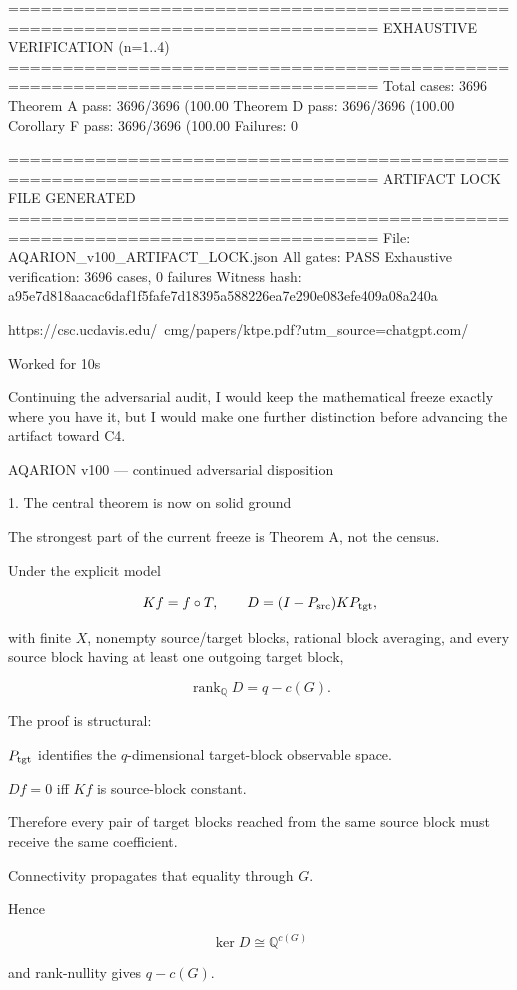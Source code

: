 ================================================================================
EXHAUSTIVE VERIFICATION (n=1..4)
================================================================================
Total cases: 3696
Theorem A pass: 3696/3696 (100.00%
Theorem D pass: 3696/3696 (100.00%
Corollary F pass: 3696/3696 (100.00%
Failures: 0

================================================================================
ARTIFACT LOCK FILE GENERATED
================================================================================
File: AQARION_v100_ARTIFACT_LOCK.json
All gates: PASS
Exhaustive verification: 3696 cases, 0 failures
Witness hash: a95e7d818aacac6daf1f5fafe7d18395a588226ea7e290e083efe409a08a240a

https://csc.ucdavis.edu/~cmg/papers/ktpe.pdf?utm_source=chatgpt.com/

Worked for 10s

Continuing the adversarial audit, I would keep the mathematical freeze exactly where you have it, but I would make one further distinction before advancing the artifact toward C4.

AQARION v100 — continued adversarial disposition

1. The central theorem is now on solid ground



The strongest part of the current freeze is Theorem A, not the census.

Under the explicit model

\[
Kf=f\circ T,\qquad  
D=(I-P_{\rm src})KP_{\rm tgt},  
\]

with finite \(X\), nonempty source/target blocks, rational block averaging, and every source block having at least one outgoing target block,

\[
\boxed{\operatorname{rank}_{\mathbb Q}D=q-c(G)}.  
\]

The proof is structural:

\(P_{\rm tgt}\) identifies the \(q\)-dimensional target-block observable space.

\(D f=0\) iff \(Kf\) is source-block constant.

Therefore every pair of target blocks reached from the same source block must receive the same coefficient.

Connectivity propagates that equality through \(G\).

Hence

\[
\ker D \cong \mathbb Q^{c(G)}  
\]

and rank-nullity gives \(q-c(G)\).

